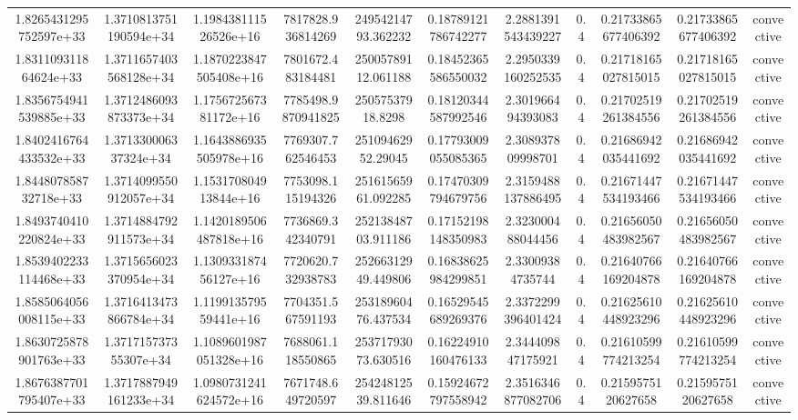 \begin{table}
\begin{tabular}{ccccccccccc}
1.8265431295752597e+33 & 1.3710813751190594e+34 & 1.198438111526526e+16 & 7817828.936814269 & 24954214793.362232 & 0.18789121786742277 & 2.2881391543439227 & 0.4 & 0.21733865677406392 & 0.21733865677406392 & convective \\
1.831109311864624e+33 & 1.3711657403568128e+34 & 1.1870223847505408e+16 & 7801672.483184481 & 25005789112.061188 & 0.18452365586550032 & 2.2950339160252535 & 0.4 & 0.21718165027815015 & 0.21718165027815015 & convective \\
1.8356754941539885e+33 & 1.3712486093873373e+34 & 1.175672567381172e+16 & 7785498.9870941825 & 25057537918.8298 & 0.18120344587992546 & 2.301966494393083 & 0.4 & 0.21702519261384556 & 0.21702519261384556 & convective \\
1.8402416764433532e+33 & 1.371330006337324e+34 & 1.1643886935505978e+16 & 7769307.762546453 & 25109462952.29045 & 0.17793009055085365 & 2.308937809998701 & 0.4 & 0.21686942035441692 & 0.21686942035441692 & convective \\
1.844807858732718e+33 & 1.3714099550912057e+34 & 1.153170804913844e+16 & 7753098.115194326 & 25161565961.092285 & 0.17470309794679756 & 2.3159488137886495 & 0.4 & 0.21671447534193466 & 0.21671447534193466 & convective \\
1.8493740410220824e+33 & 1.3714884792911573e+34 & 1.1420189506487818e+16 & 7736869.342340791 & 25213848703.911186 & 0.17152198148350983 & 2.323000488044456 & 0.4 & 0.21656050483982567 & 0.21656050483982567 & convective \\
1.8539402233114468e+33 & 1.3715656023370954e+34 & 1.130933187456127e+16 & 7720620.732938783 & 25266312949.449806 & 0.16838625984299851 & 2.33009384735744 & 0.4 & 0.21640766169204878 & 0.21640766169204878 & convective \\
1.8585064056008115e+33 & 1.3716413473866784e+34 & 1.119913579559441e+16 & 7704351.567591193 & 25318960476.437534 & 0.16529545689269376 & 2.3372299396401424 & 0.4 & 0.21625610448923296 & 0.21625610448923296 & convective \\
1.8630725878901763e+33 & 1.371715737355307e+34 & 1.1089601987051328e+16 & 7688061.118550865 & 25371793073.630516 & 0.16224910160476133 & 2.344409847175921 & 0.4 & 0.21610599774213254 & 0.21610599774213254 & convective \\
1.8676387701795407e+33 & 1.3717887949161233e+34 & 1.0980731241624572e+16 & 7671748.649720597 & 25424812539.811646 & 0.15924672797558942 & 2.3516346877082706 & 0.4 & 0.2159575120627658 & 0.2159575120627658 & convective \\

\end{tabular}
\end{table}
